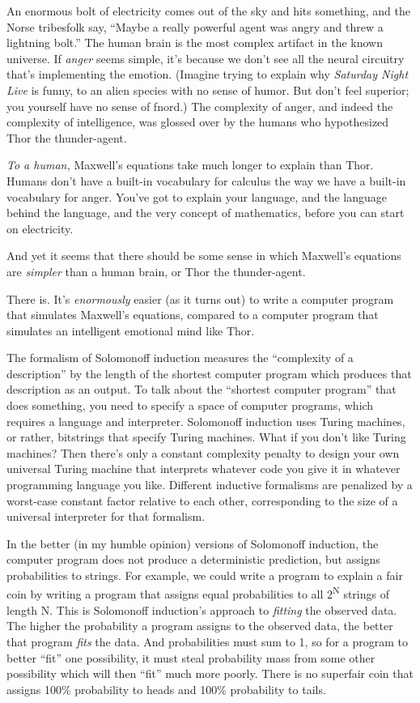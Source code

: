 {
 An enormous bolt of electricity comes out of the sky and hits
something, and the Norse tribesfolk say, ``Maybe a
really powerful agent was angry and threw a lightning
bolt.'' The human brain is the most complex artifact
in the known universe. If \textit{anger} seems simple,
it's because we don't see all the
neural circuitry that's implementing the emotion.
(Imagine trying to explain why \textit{Saturday Night Live} is funny,
to an alien species with no sense of humor. But don't
feel superior; you yourself have no sense of fnord.) The complexity of
anger, and indeed the complexity of intelligence, was glossed over by
the humans who hypothesized Thor the thunder-agent.}

{
 \textit{To a human,} Maxwell's equations take much
longer to explain than Thor. Humans don't have a
built-in vocabulary for calculus the way we have a built-in vocabulary
for anger. You've got to explain your language, and the
language behind the language, and the very concept of mathematics,
before you can start on electricity.}

{
 And yet it seems that there should be some sense in which
Maxwell's equations are \textit{simpler} than a human
brain, or Thor the thunder-agent.}

{
 There is. It's \textit{enormously} easier (as it
turns out) to write a computer program that simulates
Maxwell's equations, compared to a computer program
that simulates an intelligent emotional mind like Thor.}

{
 The formalism of Solomonoff induction measures the
``complexity of a description'' by
the length of the shortest computer program which produces that
description as an output. To talk about the ``shortest
computer program'' that does something, you need to
specify a space of computer programs, which requires a language and
interpreter. Solomonoff induction uses Turing machines, or rather,
bitstrings that specify Turing machines. What if you
don't like Turing machines? Then
there's only a constant complexity penalty to design
your own universal Turing machine that interprets whatever code you
give it in whatever programming language you like. Different inductive
formalisms are penalized by a worst-case constant factor relative to
each other, corresponding to the size of a universal interpreter for
that formalism.}

{
 In the better (in my humble opinion) versions of Solomonoff
induction, the computer program does not produce a deterministic
prediction, but assigns probabilities to strings. For example, we could
write a program to explain a fair coin by writing a program that
assigns equal probabilities to all 2\textsuperscript{N} strings of
length N. This is Solomonoff induction's approach to
\textit{fitting} the observed data. The higher the probability a
program assigns to the observed data, the better that program
\textit{fits} the data. And probabilities must sum to 1, so for a
program to better ``fit'' one
possibility, it must steal probability mass from some other possibility
which will then ``fit'' much more
poorly. There is no superfair coin that assigns 100\% probability to
heads and 100\% probability to tails.}

